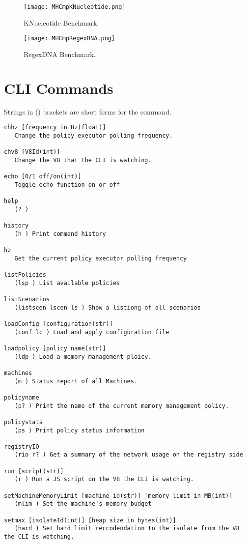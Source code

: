\documentclass{l4proj}
\begin{document}
\begin{appendices}
\begin{figure}[!ht]
  \centering
    \texttt{[image: MHCmpKNucleotide.png]}
    \caption{KNucleotide Benchmark.}
\end{figure}

\begin{figure}[!ht]
  \centering
    \texttt{[image: MHCmpRegexDNA.png]}
    \caption{RegexDNA Benchmark.}
\end{figure}
\chapter{CLI Commands}
\label{allcommands}
Strings in () brackets are short forms for the command.
\begin{lstlisting}
chhz [frequency in Hz(float)]
   Change the policy executor polling frequency.

chv8 [V8Id(int)]
   Change the V8 that the CLI is watching.

echo [0/1 off/on(int)]
   Toggle echo function on or off

help
   (? ) 

history
   (h ) Print command history

hz
   Get the current policy executor polling frequency

listPolicies
   (lsp ) List available policies

listScenarios
   (listscen lscen ls ) Show a listiong of all scenarios

loadConfig [configuration(str)]
   (conf lc ) Load and apply configuration file

loadpolicy [policy name(str)]
   (ldp ) Load a memory management ploicy.

machines
   (m ) Status report of all Machines.

policyname
   (p? ) Print the name of the current memory management policy.

policystats
   (ps ) Print policy status information

registryIO
   (rio r? ) Get a summary of the network usage on the registry side

run [script(str)]
   (r ) Run a JS script on the V8 the CLI is watching.

setMachineMemoryLimit [machine_id(str)] [memory_limit_in_MB(int)]
   (mlim ) Set the machine's memory budget

setmax [isolateId(int)] [heap size in bytes(int)]
   (hard ) Set hard limit reccodendation to the isolate from the V8 the CLI is watching.


\end{lstlisting}
\end{appendices}
\end{document}
